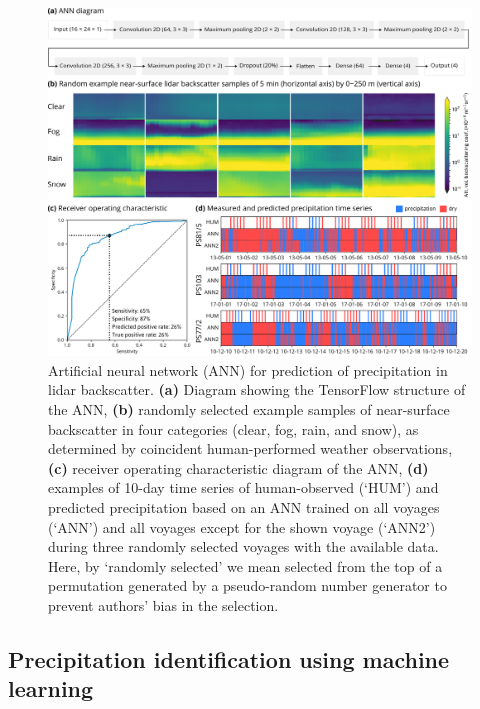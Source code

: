 \documentclass[draft]{agujournal2019}
\begin{document}
\begin{figure}[b!]
\centering
\includegraphics[width=\textwidth]{img/ann.pdf}
\caption{
Artificial neural network (ANN) for prediction of precipitation in lidar
backscatter. \textbf{(a)} Diagram showing the TensorFlow structure of the ANN,
\textbf{(b)} randomly selected example samples of near-surface backscatter in
four categories (clear, fog, rain, and snow), as determined by coincident
human-performed weather observations, \textbf{(c)} receiver operating
characteristic diagram of the ANN, \textbf{(d)} examples of 10-day time series
of human-observed (`HUM') and predicted precipitation based on an ANN trained
on all voyages (`ANN') and all voyages except for the shown voyage (`ANN2')
during three randomly selected voyages with the available data. Here, by
`randomly selected' we mean selected from the top of a permutation generated by
a pseudo-random number generator to prevent authors' bias in the selection.
}
\label{fig:ann}
\end{figure}

\subsection{Precipitation identification using machine learning}
\label{sec:ann}
\end{document}
